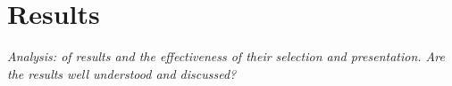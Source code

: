 \section{Results}
\label{results}

\textit{Analysis: of results and the effectiveness of their selection and presentation. Are the results well understood and discussed?}